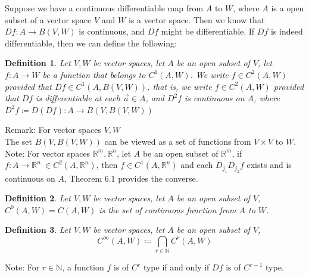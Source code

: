 \documentclass[11pt,oneside]{book}
\theoremstyle{break}
\theoremstyle{break}
\newtheorem{defn}{Definition}[corL]
\newcommand{\R}{\mathbb{R}}
\newcommand{\N}{\mathbb{N}}
\newcommand{\note}{\color{red}Note: \color{black}}
\newcommand{\remark}{\color{blue}Remark: \color{black}}
\begin{document}
Suppose we have a continuous differentiable map from $A$ to $W$, where $A$ is a open subset of a vector space $V$ and $W$ is a vector space. Then we know that $Df:A \to B(V,W)$ is continuous, and $Df$ might be differentiable. If $Df$ is indeed differentiable, then we can define the following:
\begin{defn}
Let $V,W$ be vector spaces, let $A$ be an open subset of $V$, let $f:A \to W$ be a function that belongs to $C^1(A,W)$. We write $f \in C^2(A,W)$ provided that $Df\in C^1(A,B(V,W))$, that is, we write $f \in C^2(A,W)$ provided that $Df$ is differentiable at each $\vec{a}\in A$, and $D^2f$ is continuous on $A$, where $D^2f\coloneqq D(Df): A \to B(V,B(V,W))$
\end{defn}

\remark For vector spaces $V,W$\\ The set $B(V,B(V,W))$ can be viewed as a set of functions from $V \times V$ to $W$.\\

\note For vector spaces $\R^m,\R^n$, let $A$ be an open subset of $\R^m$, if $f:A \to \R^n\ \in C^2(A,\R^n)$, then $f\in C^1(A,\R^n)$ and each $D_{j_1}D_{j_2}f$ exists and is continuous on $A$, Theorem 6.1 provides the converse.

\begin{defn}
Let $V,W$ be vector spaces, let $A$ be an open subset of $V$,\\
$C^0(A,W) = C(A,W)$ is the set of continuous function from $A$ to $W$.
\end{defn}

\begin{defn}
Let $V,W$ be vector spaces, let $A$ be an open subset of $V$,\\
$$C^\infty(A,W) \coloneqq \bigcap_{r \in \N} C^r(A,W)$$
\end{defn}

\note For $r \in \N$, a function $f$ is of $C^r$ type if and only if $Df$  is of $C^{r-1}$ type.
\end{document}

